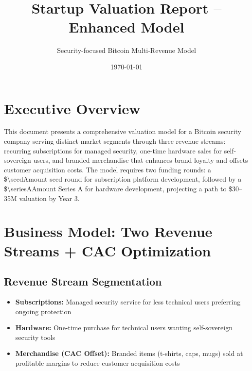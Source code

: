 \documentclass[11pt]{article}
\begin{document}
\title{Startup Valuation Report -- Enhanced Model}
\author{Security-focused Bitcoin Multi-Revenue Model}
\date{\today}
\maketitle

\section*{Executive Overview}
This document presents a comprehensive valuation model for a Bitcoin security company serving distinct market segments through three revenue streams: recurring subscriptions for managed security, one-time hardware sales for self-sovereign users, and branded merchandise that enhances brand loyalty and offsets customer acquisition costs. The model requires two funding rounds: a \$\num{\seedAmount} seed round for subscription platform development, followed by a \$\num{\seriesAAmount} Series A for hardware development, projecting a path to \$\num{30}--\num{35}M valuation by Year 3.

\section{Business Model: Two Revenue Streams + CAC Optimization}

\subsection{Revenue Stream Segmentation}
\begin{itemize}
  \item \textbf{Subscriptions:} Managed security service for less technical users preferring ongoing protection
  \item \textbf{Hardware:} One-time purchase for technical users wanting self-sovereign security tools
  \item \textbf{Merchandise (CAC Offset):} Branded items (t-shirts, caps, mugs) sold at profitable margins to reduce customer acquisition costs
\end{itemize}
\end{document}
